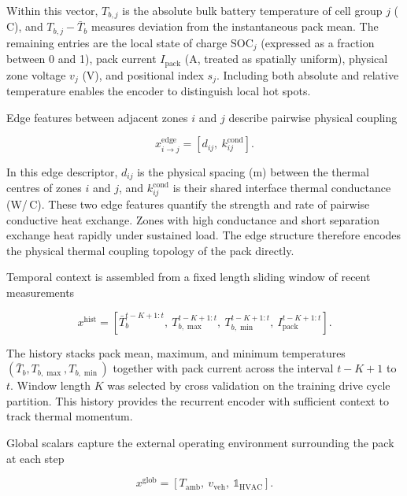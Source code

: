 \documentclass[twocolumn]{article}
\begin{document}
Within this vector, $T_{b,j}$ is the absolute bulk battery temperature of cell group $j$ (\,\textdegree{}C), and $T_{b,j}-\bar T_b$ measures deviation from the instantaneous pack mean. The remaining entries are the local state of charge $\mathrm{SOC}_j$ (expressed as a fraction between 0 and 1), pack current $I_{\mathrm{pack}}$ (A, treated as spatially uniform), physical zone voltage $v_j$ (V), and positional index $s_j$. Including both absolute and relative temperature enables the encoder to distinguish local hot spots.

Edge features between adjacent zones $i$ and $j$ describe pairwise physical coupling

\begin{equation}
x^{\mathrm{edge}}_{i\to j} = [d_{ij},\ k_{ij}^{\mathrm{cond}}].
\end{equation}

In this edge descriptor, $d_{ij}$ is the physical spacing (m) between the thermal centres of zones $i$ and $j$, and $k_{ij}^{\mathrm{cond}}$ is their shared interface thermal conductance (W/\,\textdegree{}C). These two edge features quantify the strength and rate of pairwise conductive heat exchange. Zones with high conductance and short separation exchange heat rapidly under sustained load. The edge structure therefore encodes the physical thermal coupling topology of the pack directly.

Temporal context is assembled from a fixed length sliding window of recent measurements

\begin{equation}
x^{\mathrm{hist}} = [ \bar T_b^{t-K+1:t},\ T_{b,\max}^{t-K+1:t},\ T_{b,\min}^{t-K+1:t},\ I_{\mathrm{pack}}^{t-K+1:t} ].
\end{equation}

The history stacks pack mean, maximum, and minimum temperatures $(\bar T_b, T_{b,\max}, T_{b,\min})$ together with pack current across the interval $t-K+1$ to $t$. Window length $K$ was selected by cross validation on the training drive cycle partition. This history provides the recurrent encoder with sufficient context to track thermal momentum.

Global scalars capture the external operating environment surrounding the pack at each step

\begin{equation}
x^{\mathrm{glob}} = [T_{\mathrm{amb}},\ v_{\mathrm{veh}},\ \mathbb{1}_{\mathrm{HVAC}}].
\end{equation}
\end{document}
